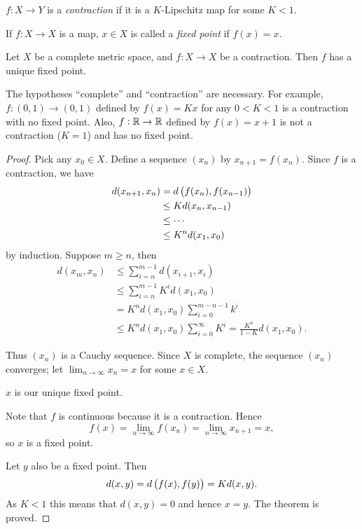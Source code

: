 $f:X\to Y$ is a \emph{contraction} if it is a $K$-Lipschitz map for some $K<1$.

If $f:X\to X$ is a map, $x\in X$ is called a \emph{fixed point} if $f(x)=x$.

\begin{theorem}
Let $X$ be a complete metric space, and $f:X\to X$ be a contraction. Then $f$ has a unique fixed point.
\end{theorem}

\begin{remark}
The hypotheses ``complete'' and ``contraction'' are necessary. For example, $f:(0,1)\to(0,1)$ defined by $f(x)=Kx$ for any $0<K<1$ is a contraction with no fixed point. Also, $f:\mathbb R\to\mathbb R$ defined by $f(x)=x+1$ is not a contraction ($K=1$) and has no fixed point.
\end{remark}

\begin{proof}
Pick any $x_0\in X$. Define a sequence $(x_n)$ by $x_{n+1}=f(x_n)$. Since $f$ is a contraction, we have
\begin{align*}
d(x_{n+1},x_n)
&=d\left(f(x_n),f(x_{n-1})\right)\\
&\le K d(x_n,x_{n-1})\\
&\le\cdots\\
&\le K^n d(x_1,x_0)
\end{align*}
by induction. Suppose $m\ge n$, then
\begin{align*}
d(x_m,x_n)
&\le\sum_{i=n}^{m-1}d(x_{i+1},x_i)\\
&\le\sum_{i=n}^{m-1}K^i d(x_1,x_0)\\
&=K^n d(x_1,x_0)\sum_{i=0}^{m-n-1}k^i\\
&\le K^n d(x_1,x_0)\sum_{i=0}^{\infty}K^i=\frac{K^n}{1-K}d(x_1,x_0).
\end{align*}

Thus $(x_n)$ is a Cauchy sequence. Since $X$ is complete, the sequence $(x_n)$ converges; let $\displaystyle\lim_{n\to\infty}x_n=x$ for some $x\in X$.

\begin{claim}
$x$ is our unique fixed point.
\end{claim}

Note that $f$ is continuous because it is a contraction. Hence
\[f(x)=\lim_{n\to\infty}f(x_n)=\lim_{n\to\infty}x_{n+1}=x,\]
so $x$ is a fixed point.

Let $y$ also be a fixed point. Then
\[d(x,y)=d\left(f(x),f(y)\right)=K d(x,y).\]
As $K<1$ this means that $d(x,y)=0$ and hence $x=y$. The theorem is proved.
\end{proof}

